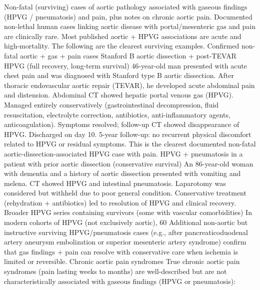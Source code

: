 Non-fatal (surviving) cases of aortic pathology associated with gaseous findings (HPVG / pneumatosis) and pain, plus notes on chronic aortic pain.
Documented non-lethal human cases linking aortic disease with portal/mesenteric gas and pain are clinically rare. Most published aortic + HPVG associations are acute and high-mortality. The following are the clearest surviving examples.
Confirmed non-fatal aortic + gas + pain cases
Stanford B aortic dissection + post-TEVAR HPVG (full recovery, long-term survival)
46-year-old man presented with acute chest pain and was diagnosed with Stanford type B aortic dissection. After thoracic endovascular aortic repair (TEVAR), he developed acute abdominal pain and distension. Abdominal CT showed hepatic portal venous gas (HPVG).
Managed entirely conservatively (gastrointestinal decompression, fluid resuscitation, electrolyte correction, antibiotics, anti-inflammatory agents, anticoagulation). Symptoms resolved; follow-up CT showed disappearance of HPVG. Discharged on day 10.
5-year follow-up: no recurrent physical discomfort related to HPVG or residual symptoms. This is the clearest documented non-fatal aortic-dissection-associated HPVG case with pain.
HPVG + pneumatosis in a patient with prior aortic dissection (conservative survival)
An 86-year-old woman with dementia and a history of aortic dissection presented with vomiting and melena. CT showed HPVG and intestinal pneumatosis. Laparotomy was considered but withheld due to poor general condition. Conservative treatment (rehydration + antibiotics) led to resolution of HPVG and clinical recovery.
Broader HPVG series containing survivors (some with vascular comorbidities)
In modern cohorts of HPVG (not exclusively aortic), 60 %
Additional non-aortic but instructive surviving HPVG/pneumatosis cases (e.g., after pancreaticoduodenal artery aneurysm embolization or superior mesenteric artery syndrome) confirm that gas findings + pain can resolve with conservative care when ischemia is limited or reversible.
Chronic aortic pain syndromes
True chronic aortic pain syndromes (pain lasting weeks to months) are well-described but are not characteristically associated with gaseous findings (HPVG or pneumatosis):
